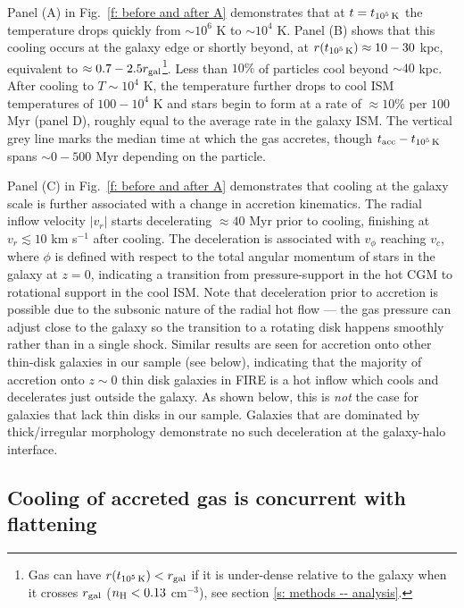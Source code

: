 \documentclass[fleqn,usenatbib]{mnras}
\newcommand{\tcools}{t_{10^5\,{\rm K}}}
\newcommand{\tacc}{t_{\rm acc}}
\begin{document}
Panel (A) in Fig.~\ref{f: before and after A} demonstrates that at $t = \tcools$ the temperature drops quickly from ${\sim}10^6$ K to ${\sim}10^4$ K.
Panel (B) shows that this cooling occurs at the galaxy edge or shortly beyond, at $r(\tcools) \approx 10-30$ kpc, equivalent to $\approx0.7 - 2.5 r_{\rm gal}$\footnote{Gas can have $r(\tcools) < r_{\rm gal}$ if it is under-dense relative to the galaxy when it crosses $r_{\rm gal}$ ($n_{\rm H} < 0.13$ cm$^{-3}$), see section \ref{s: methods -- analysis}.}.
Less than $10\%$ of particles cool beyond $\sim 40$ kpc.
After cooling to $T \sim 10^4$ K, the temperature further drops to cool ISM temperatures of $100-10^4$ K and stars begin to form at a rate of $\approx10\%$ per $100$ Myr (panel D), roughly equal to the average rate in the galaxy ISM. 
The vertical grey line marks the median time at which the gas accretes, though $\tacc - \tcools$ spans $\sim0-500$ Myr depending on the particle.

Panel (C) in Fig.~\ref{f: before and after A} demonstrates that cooling at the galaxy scale is further associated with a change in accretion kinematics.
The radial inflow velocity $\vert v_r \vert $ starts decelerating $\approx40$ Myr prior to cooling, finishing at $v_{r} \lesssim10$ km s$^{-1}$ after cooling.
The deceleration is associated with $v_\phi$ reaching $v_c$, where $\phi$ is defined with respect to the total angular momentum of stars in the galaxy at $z=0$, indicating a transition from pressure-support in the hot CGM to rotational support in the cool ISM.
Note that deceleration prior to accretion is possible due to the subsonic nature of the radial hot flow --- the gas pressure can adjust close to the galaxy so the transition to a rotating disk happens smoothly rather than in a single shock.
Similar results are seen for accretion onto other thin-disk galaxies in our sample (see below), indicating that the majority of accretion onto $z\sim0$ thin disk galaxies in FIRE is a hot inflow which cools and decelerates just outside the galaxy.
As shown below, this is {\em not} the case for galaxies that lack thin disks in our sample. 
Galaxies that are dominated by thick/irregular morphology demonstrate no such deceleration at the galaxy-halo interface.


\subsection{Cooling of accreted gas is concurrent with flattening}
\label{s: characteristics -- aligns}
\end{document}
